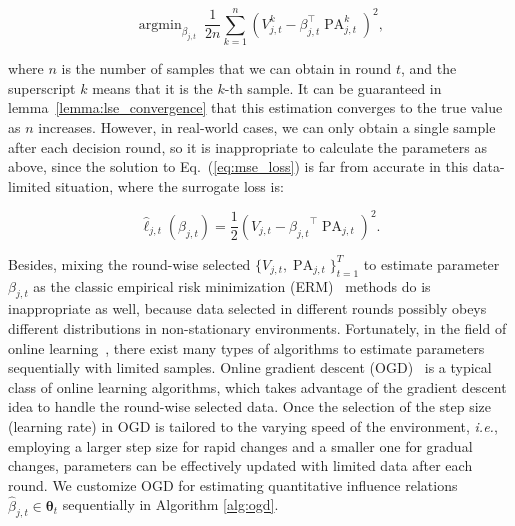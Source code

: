 \documentclass{article}
\theoremstyle{plain}
\theoremstyle{definition}
\theoremstyle{remark}
\def \ie {\textit{i.e.}}
\def \Eq {Eq.}
\def \PA {\operatorname{PA}}
\begin{document}
\vskip -0.1in
\begin{equation}
  \label{eq:mse_loss}
  \mathop{\arg\min}_{\beta_{j, t}}\ \frac{1}{2n}\sum_{k=1}^{n}\left(V^k_{j, t} - {\beta^\top_{j, t}} \PA^{k}_{j, t}\right)^2,
\end{equation}
\vskip -0.05in

where $n$ is the number of samples that we can obtain in round $t$, and the superscript $k$ means that it is the $k$-th sample.
It can be guaranteed in lemma~\ref{lemma:lse_convergence} that this estimation converges to the true value as $n$ increases. 
However, in real-world cases, we can only obtain a single sample after each decision round, 
so it is inappropriate to calculate the parameters as above, 
since the solution to \Eq~(\ref{eq:mse_loss}) is far from accurate in this data-limited situation, 
where the surrogate loss is:

\vskip -0.1in
\begin{equation}
  \label{eq:surr_loss}
  \hat{\ell}_{j, t}\left(\beta_{j, t}\right) = \frac{1}{2}\left(V_{j, t} - {\beta_{j, t}}^\top \PA_{j, t}\right)^2.
\end{equation}
\vskip -0.02in



Besides, mixing the round-wise selected $\{V_{j, t}, \PA_{j, t}\}_{t=1}^T$ to estimate parameter $\beta_{j, t}$ as the classic empirical risk minimization (ERM)~\citep{mohri2018foundations} methods do is inappropriate as well, 
because data selected in different rounds possibly obeys different distributions in non-stationary environments. 
Fortunately, in the field of online learning~\citep{vovk1990aggregating,yoav1997boosting, hazan2016oco}, 
there exist many types of algorithms to estimate parameters sequentially with limited samples. 
Online gradient descent (OGD)~\citep{zinkevich2003OGD, shwartzSS2007OGD} is a typical class of online learning algorithms, 
which takes advantage of the gradient descent idea to handle the round-wise selected data. 
Once the selection of the step size (learning rate) in OGD is tailored to the varying speed of the environment,
\ie, employing a larger step size for rapid changes and a smaller one for gradual changes,  parameters can be effectively updated with limited data after each round. 
We customize OGD for estimating quantitative influence relations $\hat{\beta}_{j, t}\in\bm{\theta}_t$ sequentially in Algorithm \ref{alg:ogd}.
\end{document}
